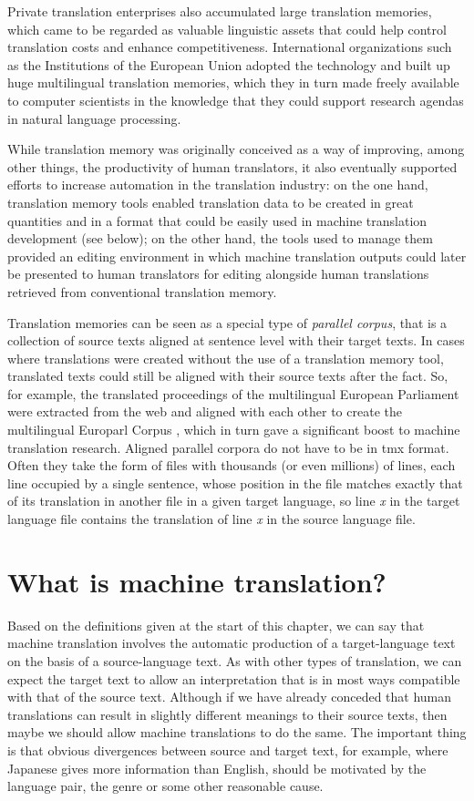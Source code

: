\documentclass[output=paper]{langscibook}
\begin{document}
Private translation enterprises also accumulated large translation memories, which came to be regarded as valuable linguistic assets that could help control translation costs and enhance competitiveness. International organizations such as the Institutions of the European Union adopted the technology and built up huge multilingual translation memories, which they in turn made freely available to computer scientists in the knowledge that they could support research agendas in natural language processing.

While translation memory was originally conceived as a way of improving, among other things, the productivity of human translators, it also eventually supported efforts to increase automation in the translation industry: on the one hand, translation memory tools enabled translation data to be created in great quantities and in a format that could be easily used in machine translation development (see below); on the other hand, the tools used to manage them provided an editing environment in which machine translation outputs could later be presented to human translators for editing alongside human translations retrieved from conventional translation memory. 

Translation memories can be seen as a special type of \textit{parallel corpus}, that is a collection of source texts aligned at sentence level with their target texts. In cases where translations were created without the use of a translation memory tool, translated texts could still be aligned with their source texts after the fact. So, for example, the translated proceedings of the multilingual European Parliament were extracted from the web and aligned with each other to create the multilingual Europarl Corpus \citep{Koehn2005}, which in turn gave a significant boost to machine translation research. Aligned parallel corpora do not have to be in tmx format. Often they take the form of files with thousands (or even millions) of lines, each line occupied by a single sentence, whose position in the file matches exactly that of its translation in another file in a given target language, so line \textit{x} in the target language file contains the translation of line \textit{x} in the source language file.

\section{What is machine translation?}
Based on the definitions given at the start of this chapter, we can say that machine translation involves the automatic production of a target-language text on the basis of a source-language text. As with other types of translation, we can expect the target text to allow an interpretation that is in most ways compatible with that of the source text. Although if we have already conceded that human translations can result in slightly different meanings to their source texts, then maybe we should allow machine translations to do the same. The important thing is that obvious divergences between source and target text, for example, where Japanese gives more information than English, should be motivated by the language pair, the genre or some other reasonable cause.
\end{document}
